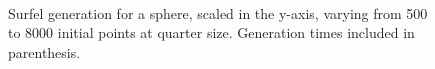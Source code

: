 \begin{figure}[h!]
   \\
   \captionfonts
   \caption[Sphere surfels at quarter size]{Surfel generation for a sphere, scaled in the y-axis, varying from 500 to 8000 initial points at quarter size. Generation times included in parenthesis.}
   \label{fig:small_sphere_surfels}
\end{figure}

